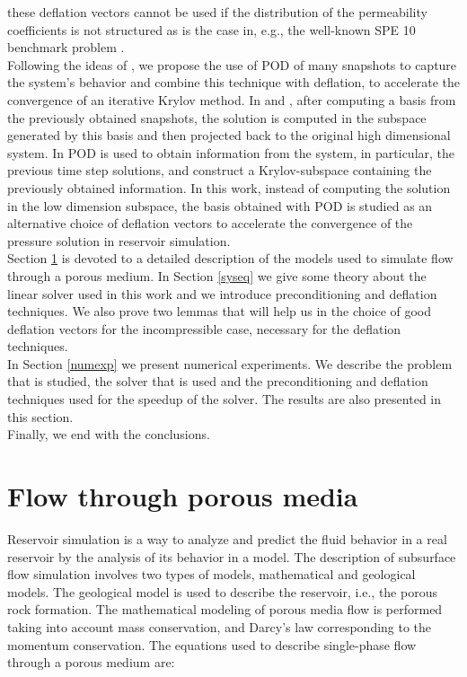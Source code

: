 \documentclass[12pt]{article}
\numberwithin{equation}{section}
\begin{document}
these deflation vectors cannot be used if the distribution of the permeability coefficients  is not 
structured as is the case in, e.g., the well-known SPE 10 benchmark problem \cite{Christie01}.\\
Following the ideas of \cite{Astrid11,Mark06,Pasetto16,Carlberg15}, we propose the use of POD of many snapshots to capture the system's behavior and combine this technique with deflation, to  accelerate the convergence of an iterative Krylov method. In \cite{Astrid11,Mark06} and \cite{Pasetto16}, after computing a basis from the previously obtained snapshots, the solution is computed in the subspace generated by this basis and then projected back to the original high dimensional system. In \cite{Carlberg15} POD is used to obtain information from the system, in particular, the previous time step solutions, and construct a Krylov-subspace containing the previously obtained information.
In this work, instead of computing the solution in the low dimension subspace, the basis obtained with POD is studied as an alternative choice of deflation vectors 
to accelerate the convergence of the pressure solution in reservoir simulation.  \\
  Section \ref{fpm} is devoted to a detailed description of the models used to simulate flow through a porous medium. In Section \ref{syseq} we give some theory about the linear solver used in this work and we introduce preconditioning and deflation techniques. We also prove two lemmas that will help us in the choice of good deflation vectors for the incompressible case, necessary for the deflation techniques.\\
 In Section \ref{numexp} we present numerical experiments. We describe the problem that is studied, the solver that is used and the preconditioning and deflation techniques used for the speedup of the solver. The results are also presented in this section. \\
 Finally, we end with the conclusions.
 
 
 \newpage
 \section{Flow through porous media}\label{fpm}
\hspace{0.5cm}Reservoir simulation is a way to analyze and predict the fluid behavior in a real reservoir
by the analysis of its behavior in a model. The description of subsurface flow simulation involves two types of models, mathematical and geological models. The geological model is used to describe the reservoir, i.e., the porous rock formation. 
The mathematical modeling of porous media flow is performed taking into account mass conservation, and Darcy's law
corresponding to the momentum conservation. The equations used to describe single-phase flow through a porous medium are:\\
\end{document}
